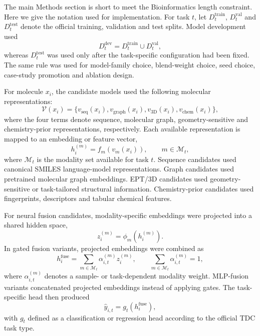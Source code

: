 \documentclass[10pt]{article}
\begin{document}
The main Methods section is short to meet the Bioinformatics length constraint. Here we give the notation used for implementation. For task $t$, let $D_t^{\mathrm{train}}$, $D_t^{\mathrm{val}}$ and $D_t^{\mathrm{test}}$ denote the official training, validation and test splits. Model development used
\begin{equation}
  D_t^{\mathrm{dev}} = D_t^{\mathrm{train}} \cup D_t^{\mathrm{val}},
\end{equation}
whereas $D_t^{\mathrm{test}}$ was used only after the task-specific configuration had been fixed. The same rule was used for model-family choice, blend-weight choice, seed choice, case-study promotion and ablation design.

For molecule $x_i$, the candidate models used the following molecular representations:
\begin{equation}
  \mathcal{V}(x_i)=
  \{v_{\mathrm{seq}}(x_i), v_{\mathrm{graph}}(x_i), v_{\mathrm{3D}}(x_i), v_{\mathrm{chem}}(x_i)\},
\end{equation}
where the four terms denote sequence, molecular graph, geometry-sensitive and chemistry-prior representations, respectively. Each available representation is mapped to an embedding or feature vector,
\begin{equation}
  h_i^{(m)} = f_m\!\left(v_m(x_i)\right), \qquad m \in \mathcal{M}_t,
\end{equation}
where $\mathcal{M}_t$ is the modality set available for task $t$. Sequence candidates used canonical SMILES language-model representations. Graph candidates used pretrained molecular graph embeddings. EPT/3D candidates used geometry-sensitive or task-tailored structural information. Chemistry-prior candidates used fingerprints, descriptors and tabular chemical features.

For neural fusion candidates, modality-specific embeddings were projected into a shared hidden space,
\begin{equation}
  z_i^{(m)} = \phi_m\!\left(h_i^{(m)}\right).
\end{equation}
In gated fusion variants, projected embeddings were combined as
\begin{equation}
  h_i^{\mathrm{fuse}} =
  \sum_{m \in \mathcal{M}_t}\alpha_{i,t}^{(m)} z_i^{(m)},
  \qquad
  \sum_{m \in \mathcal{M}_t}\alpha_{i,t}^{(m)}=1,
\end{equation}
where $\alpha_{i,t}^{(m)}$ denotes a sample- or task-dependent modality weight. MLP-fusion variants concatenated projected embeddings instead of applying gates. The task-specific head then produced
\begin{equation}
  \hat{y}_{i,t}=g_t\!\left(h_i^{\mathrm{fuse}}\right),
\end{equation}
with $g_t$ defined as a classification or regression head according to the official TDC task type.
\end{document}
